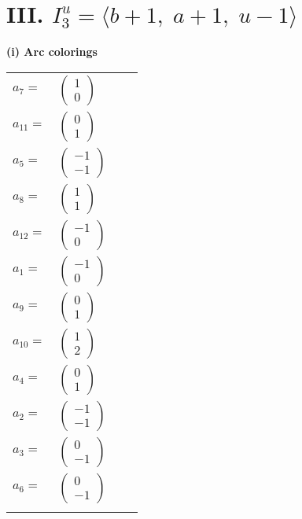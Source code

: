 \documentclass[1p]{elsarticle_modified}
\theoremstyle{definition}
\begin{document}
\centering \section*{III. $I^u_{3}= \langle b+1,\;a+1,\;u-1 \rangle$}
\flushleft \textbf{(i) Arc colorings}\\
\begin{tabular}{m{7pt} m{180pt} m{7pt} m{180pt} }
\flushright $a_{7}=$&$\begin{pmatrix}1\\0\end{pmatrix}$ \\
\flushright $a_{11}=$&$\begin{pmatrix}0\\1\end{pmatrix}$ \\
\flushright $a_{5}=$&$\begin{pmatrix}-1\\-1\end{pmatrix}$ \\
\flushright $a_{8}=$&$\begin{pmatrix}1\\1\end{pmatrix}$ \\
\flushright $a_{12}=$&$\begin{pmatrix}-1\\0\end{pmatrix}$ \\
\flushright $a_{1}=$&$\begin{pmatrix}-1\\0\end{pmatrix}$ \\
\flushright $a_{9}=$&$\begin{pmatrix}0\\1\end{pmatrix}$ \\
\flushright $a_{10}=$&$\begin{pmatrix}1\\2\end{pmatrix}$ \\
\flushright $a_{4}=$&$\begin{pmatrix}0\\1\end{pmatrix}$ \\
\flushright $a_{2}=$&$\begin{pmatrix}-1\\-1\end{pmatrix}$ \\
\flushright $a_{3}=$&$\begin{pmatrix}0\\-1\end{pmatrix}$ \\
\flushright $a_{6}=$&$\begin{pmatrix}0\\-1\end{pmatrix}$\\&\end{tabular}
\end{document}
